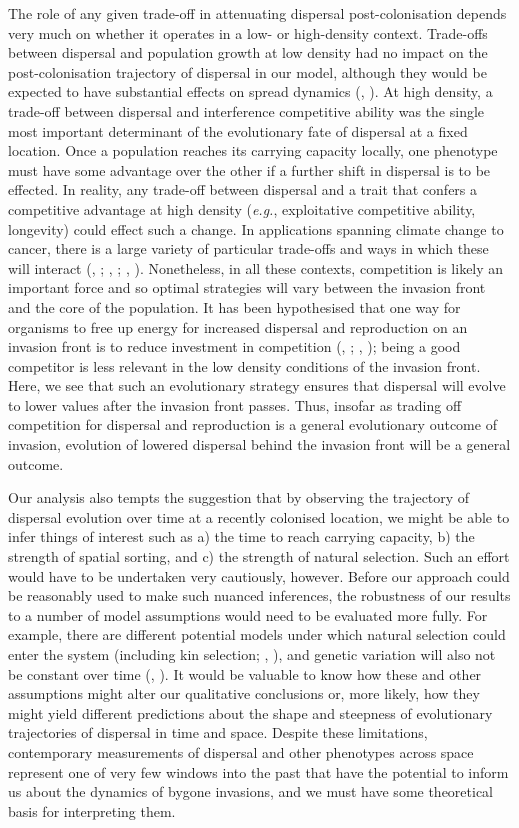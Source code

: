 \documentclass[11pt]{article}
\newcommand{\eg}{{\em e.g.}, }
\newcommand{\CiteP}[1]{(\citeauthor{#1}, \citeyear{#1})}
\newcommand{\Cite}[1]{\citeauthor{#1}, \citeyear{#1}}
\begin{document}
The role of any given trade-off in attenuating dispersal post-colonisation depends very much on whether it operates in a low- or high-density context. Trade-offs between dispersal and population growth at low density had no impact on the post-colonisation trajectory of dispersal in our model, although they would be expected to have substantial effects on spread dynamics \CiteP{Burton2010}. At high density, a trade-off between dispersal and interference competitive ability was the single most important determinant of the evolutionary fate of dispersal at a fixed location. Once a population reaches its carrying capacity locally, one phenotype must have some advantage over the other if a further shift in dispersal is to be effected. In reality, any trade-off between dispersal and a trait that confers a competitive advantage at high density (\eg exploitative competitive ability, longevity) could effect such a change. In applications spanning climate change to cancer, there is a large variety of particular trade-offs and ways in which these will interact (\Cite{Duputie2012}; \Cite{Aktipis2012}; \Cite{Orlando2013}). Nonetheless, in all these contexts, competition is likely an important force and so optimal strategies will vary between the invasion front and the core of the population. It has been hypothesised that one way for organisms to free up energy for increased dispersal and reproduction on an invasion front is to reduce investment in competition (\Cite{Burton2010}; \Cite{Phillips2010}); being a good competitor is less relevant in the low density conditions of the invasion front. Here, we see that such an evolutionary strategy ensures that dispersal will evolve to lower values after the invasion front passes. Thus, insofar as trading off competition for dispersal and reproduction is a general evolutionary outcome of invasion, evolution of lowered dispersal behind the invasion front will be a general outcome.

Our analysis also tempts the suggestion that by observing the trajectory of dispersal evolution over time at a recently colonised location, we might be able to infer things of interest such as a) the time to reach carrying capacity, b) the strength of spatial sorting, and c) the strength of natural selection.  Such an effort would have to be undertaken very cautiously, however. Before our approach could be reasonably used to make such nuanced inferences, the robustness of our results to a number of model assumptions would need to be evaluated more fully. For example, there are different potential models under which natural selection could enter the system (including kin selection; \Cite{Kubisch2013}), and genetic variation will also not be constant over time \CiteP{Polechova2009}. It would be valuable to know how these and other assumptions might alter our qualitative conclusions or, more likely, how they might yield different predictions about the shape and steepness of evolutionary trajectories of dispersal in time and space. Despite these limitations, contemporary measurements of dispersal and other phenotypes across space represent one of very few windows into the past that have the potential to inform us about the dynamics of bygone invasions, and we must have some theoretical basis for interpreting them.
\end{document}
